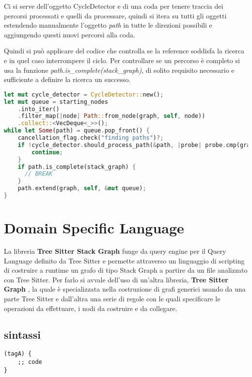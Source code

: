 Ci si serve dell'oggetto CycleDetector e di una coda per tenere traccia dei percorsi processati e quelli da processare, quindi si itera su tutti gli oggetti estendendo manualmente l'oggetto \emph{path} in tutte le direzioni possibili e aggiungendo questi nuovi percorsi alla coda.

Quindi si pu\`o applicare del codice che controlla se la reference soddisfa la ricerca e in quel caso interrompere il ciclo. Per controllare se un percorso \`e completo si usa la funzione \emph{path.is\_complete(stack\_graph)}, di solito requisito necessario e sufficiente a definire la ricerca un successo.

\begin{lstlisting}[language=Rust]
let mut cycle_detector = CycleDetector::new();
let mut queue = starting_nodes
    .into_iter()
    .filter_map(|node| Path::from_node(graph, self, node))
    .collect::<VecDeque<_>>();
while let Some(path) = queue.pop_front() {
    cancellation_flag.check("finding paths")?;
    if !cycle_detector.should_process_path(&path, |probe| probe.cmp(graph, self, &path)) {
        continue;
    }
    if path.is_complete(stack_graph) {
      // BREAK
    }
    path.extend(graph, self, &mut queue);
}
\end{lstlisting}

\section{Domain Specific Language}

La libreria \textbf{Tree Sitter Stack Graph} \cite{TreeSitterStackGraph} funge da query engine per il Query Language definito da Tree Sitter e permette attraverso un linguaggio di scripting di costruire a runtime un grafo di tipo Stack Graph a partire da un file analizzato con Tree Sitter.
Per farlo si avvale dell'uso di un'altra libreria, \textbf{Tree Sitter Graph} \cite{TreeSitterGraph}, la quale \`e specializzata nella costruzione di grafi generici usando da una parte Tree Sitter e dall'altra una serie di regole con le quali specificare le operazioni da effettuare, i nodi da costruire e da collegare.

\subsection{sintassi}

\begin{lstlisting}
(tagA) {
    ;; code
}
\end{lstlisting}

